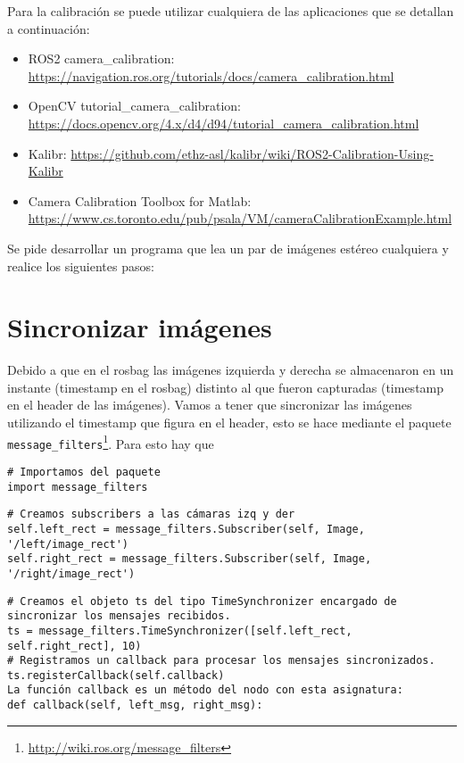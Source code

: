 \documentclass[tp]{lcc}
\begin{document}
Para la calibración se puede utilizar cualquiera de las aplicaciones que se detallan a continuación:
\begin{itemize}
	\item ROS2 camera\_calibration:  \url{https://navigation.ros.org/tutorials/docs/camera_calibration.html}
	\item OpenCV tutorial\_camera\_calibration:\\ \url{https://docs.opencv.org/4.x/d4/d94/tutorial_camera_calibration.html}
	\item Kalibr: \url{https://github.com/ethz-asl/kalibr/wiki/ROS2-Calibration-Using-Kalibr}
	\item Camera Calibration Toolbox for Matlab:\\ \url{https://www.cs.toronto.edu/pub/psala/VM/cameraCalibrationExample.html}
\end{itemize}

Se pide desarrollar un programa que lea un par de imágenes estéreo cualquiera y realice los siguientes pasos:


\section{Sincronizar imágenes}
Debido a que en el rosbag las imágenes izquierda y derecha se almacenaron en un instante (timestamp en el rosbag) distinto al que fueron capturadas (timestamp en el header de las imágenes). Vamos a tener que sincronizar las imágenes utilizando el timestamp que figura en el header, esto se hace mediante el paquete \lstinline{message_filters}\footnote{\url{http://wiki.ros.org/message_filters}}. Para esto hay que 

\begin{lstlisting}[style=python]
# Importamos del paquete
import message_filters
\end{lstlisting}

\begin{lstlisting}[style=python] 
# Creamos subscribers a las cámaras izq y der
self.left_rect = message_filters.Subscriber(self, Image, '/left/image_rect')
self.right_rect = message_filters.Subscriber(self, Image, '/right/image_rect')
\end{lstlisting}

\begin{lstlisting}[style=python] 
# Creamos el objeto ts del tipo TimeSynchronizer encargado de sincronizar los mensajes recibidos.
ts = message_filters.TimeSynchronizer([self.left_rect, self.right_rect], 10)
# Registramos un callback para procesar los mensajes sincronizados.
ts.registerCallback(self.callback)
La función callback es un método del nodo con esta asignatura:
def callback(self, left_msg, right_msg):
\end{lstlisting}
\end{document}
